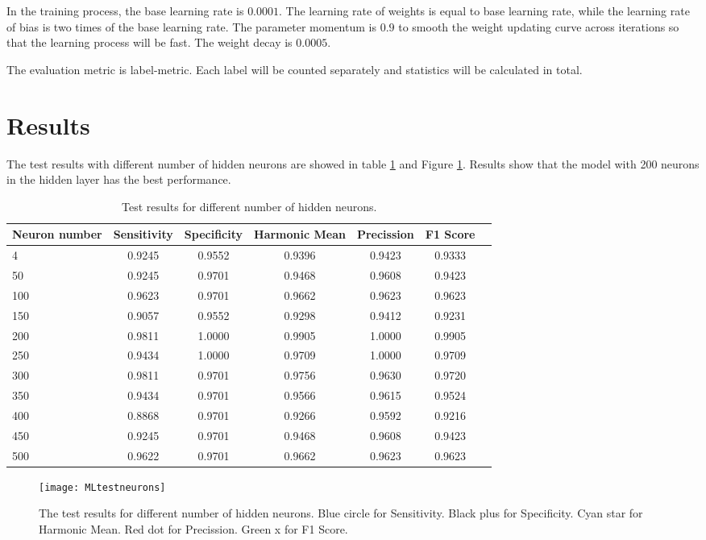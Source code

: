 In the training process, the base learning rate is $0.0001$. The learning rate of weights is equal to base learning rate, while the learning rate of bias is two times of the base learning rate. The parameter momentum is $0.9$ to smooth the weight updating curve across iterations so that the learning process will be fast. The weight decay is $0.0005$.

The evaluation metric is label-metric. Each label will be counted separately and statistics will be calculated in total.

\section{Results}

The test results with different number of hidden neurons are showed in table \ref{tb:tMLtestneurons} and Figure \ref{fig:MLtestneurons}. Results show that the model with 200 neurons in the hidden layer has the best performance.
\begin{table}
\centering
\begin{tabular}{l*{6}{c}}
Neuron number              & Sensitivity & Specificity & Harmonic Mean & Precission & F1 Score  \\
\hline
4 				& 0.9245 & 0.9552 & 0.9396 & 0.9423 & 0.9333   \\
50              & 0.9245 & 0.9701 & 0.9468 & 0.9608 & 0.9423   \\
100             & 0.9623 & 0.9701 & 0.9662 & 0.9623 &  0.9623  \\
150             & 0.9057 & 0.9552 & 0.9298 & 0.9412 &  0.9231   \\
200             & 0.9811 & 1.0000 & 0.9905 & 1.0000 &  0.9905   \\
250             & 0.9434 & 1.0000 & 0.9709 & 1.0000 &  0.9709   \\
300             & 0.9811 & 0.9701 & 0.9756 & 0.9630 &  0.9720   \\
350             & 0.9434 & 0.9701 & 0.9566 & 0.9615 &  0.9524   \\
400             & 0.8868 & 0.9701 & 0.9266 & 0.9592 &  0.9216   \\
450             & 0.9245 & 0.9701 & 0.9468 & 0.9608 &  0.9423   \\
500             & 0.9622 & 0.9701 & 0.9662 & 0.9623 &  0.9623   \\
\end{tabular}
\caption{\label{tb:tMLtestneurons}Test results for different number of hidden neurons.}
\end{table}
\begin{figure}[htb]
\centering
\texttt{[image: MLtestneurons]}
\caption{\label{fig:MLtestneurons}The test results for different number of hidden neurons. Blue circle for Sensitivity. Black plus for Specificity. Cyan star for Harmonic Mean. Red dot for Precission. Green x for F1 Score.}
\end{figure}


